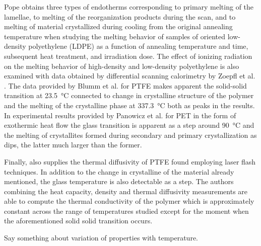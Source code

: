 Pope \citep{popeCharacterizationOrientedLowdensity1976} obtains three types of endotherms corresponding to primary melting of the lamellae, to melting of the reorganization products during the scan, and to melting of material crystallized during cooling from the original annealing temperature when studying the melting behavior of samples of oriented low-density polyethylene (LDPE) as a function of annealing temperature and time, subsequent heat treatment, and irradiation dose.
The effect of ionizing radiation on the melting behavior of high-density and low-density
polyethylene is also examined with data obtained by differential scanning calorimetry by Zoepfl et al. \citep{zoepflDifferentialScanningCalorimetry1984}.
The data provided by Blumm et al. \citep{blummCharacterizationPTFEUsing2010} for PTFE makes apparent the solid-solid transition at \SI{23.5}{\celsius} connected to change in crystalline structure of the polymer and the melting of the crystalline phase at \SI{337.3}{\celsius} both as peaks in the results.
In experimental results provided by Panowicz et al. \citep{panowiczPropertiesPolyethyleneTerephthalate2021} for PET in the form of exothermic heat flow the glass transition is apparent as a step around \SI{90}{\celsius} and the melting of crystallites formed during secondary and primary crystallization as dips, the latter much larger than the former.

Finally, \cite{blummCharacterizationPTFEUsing2010} also supplies the thermal diffusivity of PTFE found employing laser flash techniques.
In addition to the change in crystalline of the material already mentioned, the glass temperature is also detectable as a step.
The authors combining the heat capacity, density and thermal diffusivity measurements are able to compute the thermal conductivity of the polymer which is approximately constant across the range of temperatures studied except for the moment when the aforementioned solid solid transition occurs.

\colorbox{BrickRed}{Say something about variation of properties with temperature.}
